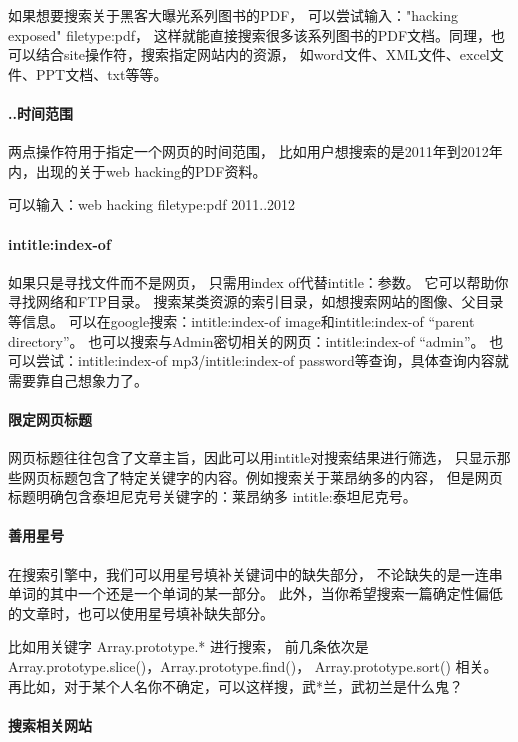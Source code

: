 \documentclass{book}
\begin{document}
如果想要搜索关于黑客大曝光系列图书的PDF，
可以尝试输入："hacking exposed" filetype:pdf，
这样就能直接搜索很多该系列图书的PDF文档。同理，也可以结合site操作符，搜索指定网站内的资源，
如word文件、XML文件、excel文件、PPT文档、txt等等。

\paragraph{..时间范围}
两点操作符用于指定一个网页的时间范围，
比如用户想搜索的是2011年到2012年内，出现的关于web hacking的PDF资料。

可以输入：web hacking filetype:pdf 2011..2012

\paragraph{intitle:index-of}
如果只是寻找文件而不是网页，
只需用index of代替intitle：参数。
它可以帮助你寻找网络和FTP目录。
搜索某类资源的索引目录，如想搜索网站的图像、父目录等信息。
可以在google搜索：intitle:index-of image和intitle:index-of “parent directory”。
也可以搜索与Admin密切相关的网页：intitle:index-of “admin”。 
也可以尝试：intitle:index-of mp3/intitle:index-of password等查询，具体查询内容就需要靠自己想象力了。

\paragraph{限定网页标题}
网页标题往往包含了文章主旨，因此可以用intitle对搜索结果进行筛选，
只显示那些网页标题包含了特定关键字的内容。例如搜索关于莱昂纳多的内容，
但是网页标题明确包含泰坦尼克号关键字的：莱昂纳多 intitle:泰坦尼克号。

\paragraph{善用星号}

在搜索引擎中，我们可以用星号填补关键词中的缺失部分，
不论缺失的是一连串单词的其中一个还是一个单词的某一部分。
此外，当你希望搜索一篇确定性偏低的文章时，也可以使用星号填补缺失部分。

比如用关键字 Array.prototype.* 进行搜索，
前几条依次是 Array.prototype.slice()，Array.prototype.find()，
Array.prototype.sort() 相关。
再比如，对于某个人名你不确定，可以这样搜，武*兰，武初兰是什么鬼？

\paragraph{搜索相关网站}
\end{document}
